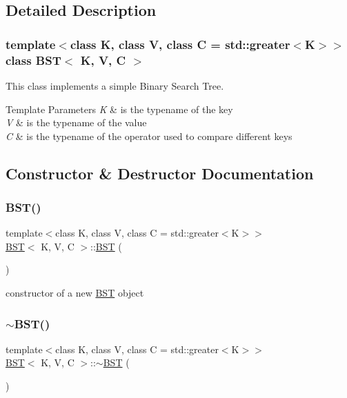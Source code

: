 \subsection{Detailed Description}
\subsubsection*{template$<$class K, class V, class C = std\+::greater$<$\+K$>$$>$\newline
class B\+S\+T$<$ K, V, C $>$}

This class implements a simple Binary Search Tree. 


\begin{DoxyTemplParams}{Template Parameters}
{\em K} & is the typename of the key \\
\hline
{\em V} & is the typename of the value \\
\hline
{\em C} & is the typename of the operator used to compare different keys \\
\hline
\end{DoxyTemplParams}


\subsection{Constructor \& Destructor Documentation}
\mbox{\label{classBST_a3cba9e816367006087a999b5e1027d72}} 
\subsubsection{\texorpdfstring{B\+S\+T()}{BST()}\hspace{0.1cm}{\footnotesize\ttfamily [1/3]}}
{\footnotesize\ttfamily template$<$class K, class V, class C = std\+::greater$<$\+K$>$$>$ \\
\hyperlink{classBST}{B\+ST}$<$ K, V, C $>$\+::\hyperlink{classBST}{B\+ST} (\begin{DoxyParamCaption}{ }\end{DoxyParamCaption})\hspace{0.3cm}{\ttfamily [inline]}}

constructor of a new \hyperlink{classBST}{B\+ST} object \mbox{\label{classBST_a77d30398500d92fe8a906c72677eaafb}} 
\subsubsection{\texorpdfstring{$\sim$\+B\+S\+T()}{~BST()}}
{\footnotesize\ttfamily template$<$class K, class V, class C = std\+::greater$<$\+K$>$$>$ \\
\hyperlink{classBST}{B\+ST}$<$ K, V, C $>$\+::$\sim$\hyperlink{classBST}{B\+ST} (\begin{DoxyParamCaption}{ }\end{DoxyParamCaption})\hspace{0.3cm}{\ttfamily [inline]}}

